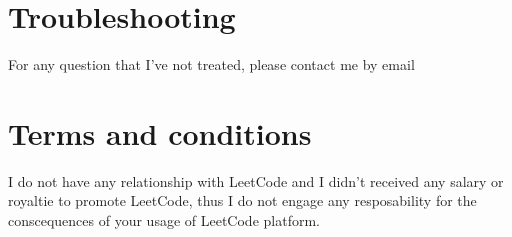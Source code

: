\documentclass[12pt, letterpaper]{article}
\begin{document}
\section{Troubleshooting}
For any question that I've not treated, please contact me by email
\section{Terms and conditions}
I do not have any relationship with LeetCode and I didn't received any salary or royaltie to promote LeetCode, thus I do not engage any resposability for the conscequences of your usage of LeetCode platform.
\end{document}
